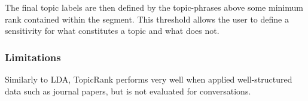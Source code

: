     The final topic labels are then defined by the topic-phrases above some minimum rank contained within the segment. This threshold allows the user to define a sensitivity for what constitutes a topic and what does not.
    
        \subsubsection{Limitations}
        Similarly to LDA, TopicRank performs very well when applied well-structured data such as journal papers, but is not evaluated for conversations.\cite{bougouin-etal-2013-topicrank}
    